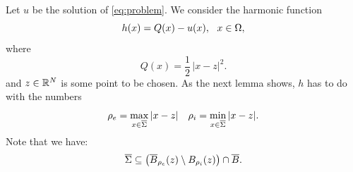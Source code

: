 \documentclass[a4paper,10pt]{amsart}
\numberwithin{equation}{section}
\begin{document}
Let $u$ be the solution of \eqref{eq:problem}. We consider the harmonic function 
\begin{equation}\label{eq:def h^z}
h (x) = Q(x) - u(x), \ \ x \in \Omega,
\end{equation}
where
\begin{equation}
\label{quadratic}
Q (x)=\frac12\, |x-z|^2.
\end{equation}
and $z\in\mathbb{R}^N$ is some point to be chosen. 
As the next lemma shows, $h$ has to do with the numbers
\begin{equation}
\label{eq:rhoe e rhoi}
\rho_e= \max_{x \in \overline{\Sigma} }{|x-z|} \quad \rho_i=\min_{x \in \overline{\Sigma} }{|x-z|}.
\end{equation}
Note that we have:
$$
\overline{\Sigma} \subseteq \left( \overline{B}_{\rho_e}(z) \setminus B_{\rho_i}(z) \right) \cap \overline{B} .
$$
\end{document}
